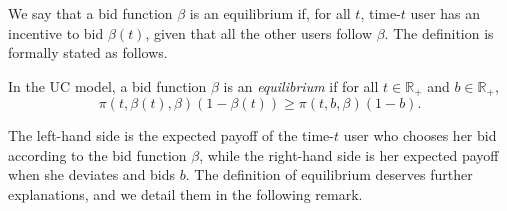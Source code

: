 \documentclass[12pt, letterpaper]{article}
\begin{document}
We say that a bid function $\beta$ is an equilibrium if, for all $t$, time-$t$ user has an incentive to bid $\beta(t)$, given that all the other users follow $\beta$. The definition is formally stated as follows.

\begin{defn}\label{defn: model 1, equilibrium}
In the UC model, a bid function $\beta$ is an \emph{equilibrium} if for all $t \in \mathbb{R}_+$ and $b \in \mathbb{R}_+$,
\begin{equation}
    \pi(t, \beta(t), \beta)(1 - \beta(t)) \ge \pi(t, b, \beta)(1 - b).
\end{equation}
\end{defn}

The left-hand side is the expected payoff of the time-$t$ user who chooses her bid according to the bid function $\beta$, while the right-hand side is her expected payoff when she deviates and bids $b$. The definition of equilibrium deserves further explanations, and we detail them in the following remark.
\end{document}
